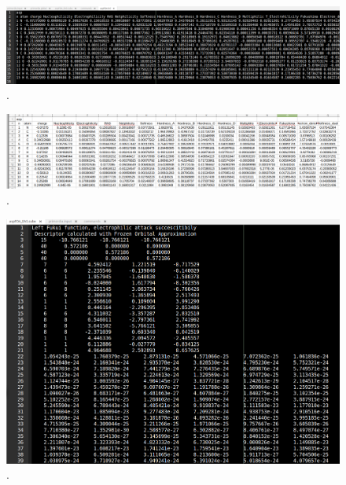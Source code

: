 \documentclass[a4paper,11pt]{refart}
\begin{document}
\hspace*{-\leftmarginwidth}
\begin{minipage}{\fullwidth}
	\begin{figure}[H]
		\begin{center}
			\includegraphics[width=6in]{images/tut4_img5}
			\caption{.}
			\label{fig_tut4_3}
		\end{center}
	\end{figure}
\end{minipage}

\hspace*{-\leftmarginwidth}
\begin{minipage}{\fullwidth}
	\begin{figure}[H]
		\begin{center}
			\includegraphics[width=6in]{images/tut4_img6}
			\caption{.}
			\label{fig_tut4_4}
		\end{center}
	\end{figure}
\end{minipage}


\hspace*{-\leftmarginwidth}
\begin{minipage}{\fullwidth}
	\begin{figure}[H]
		\begin{center}
			\includegraphics[width=5in]{images/tut4_img7}
			\caption{.}
			\label{fig_tut4_5}
		\end{center}
	\end{figure}
\end{minipage}
\end{document}
